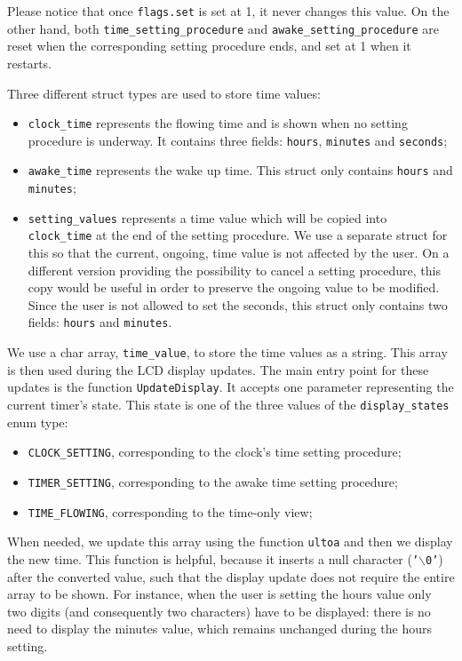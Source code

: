 Please notice that once \texttt{flags.set} is set at 1, it never changes this value. On the other hand, both \texttt{time\_setting\_procedure} and \texttt{awake\_setting\_procedure} are reset when the corresponding setting procedure ends, and set at 1 when it restarts.

Three different struct types are used to store time values:
\begin{itemize}
	\item \texttt{clock\_time} represents the flowing time and is shown when no setting procedure is underway. It contains three fields: \texttt{hours}, \texttt{minutes} and \texttt{seconds};
	\item \texttt{awake\_time} represents the wake up time. This struct only contains \texttt{hours} and \texttt{minutes};
	\item \texttt{setting\_values} represents a time value which will be copied into \\\texttt{clock\_time} at the end of the setting procedure. We use a separate struct for this so that the current, ongoing, time value is not affected by the user. On a different version providing the possibility to cancel a setting procedure, this copy would be useful in order to preserve the ongoing value to be modified. Since the user is not allowed to set the seconds, this struct only contains two fields: \texttt{hours} and \texttt{minutes}.
\end{itemize}

We use a char array, \texttt{time\_value}, to store the time values as a string. This array is then used during the LCD display updates. The main entry point for these updates is the function \texttt{UpdateDisplay}. It accepts one parameter representing the current timer's state. This state is one of the three values of the \texttt{display\_states} enum type:
\begin{itemize}
	\item \texttt{CLOCK\_SETTING}, corresponding to the clock's time setting procedure;
	\item \texttt{TIMER\_SETTING}, corresponding to the awake time setting procedure;
	\item \texttt{TIME\_FLOWING}, corresponding to the time-only view;
\end{itemize}
When needed, we update this array using the function \texttt{ultoa} and then we display the new time. This function is helpful, because it inserts a null character (\texttt{'$\backslash$0'}) after the converted value, such that the display update does not require the entire array to be shown. For instance, when the user is setting the hours value only two digits (and consequently two characters) have to be displayed: there is no need to display the minutes value, which remains unchanged during the hours setting. 

